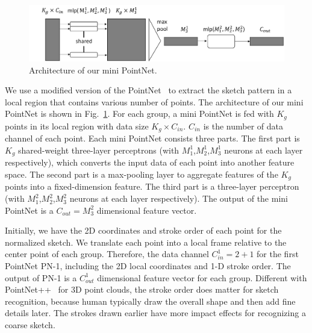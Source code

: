 \begin{figure}
	\centering
	\includegraphics[width=\columnwidth]{images/pointnet.png}
	\caption{Architecture of our mini PointNet.}
	\label{fig:miniPN}
\end{figure}

\vspace{0.1cm}
%
We use a modified version of the PointNet~\cite{qi2017pointnet} to extract the sketch pattern in a local region that contains various number of points.
The architecture of our mini PointNet is shown in Fig.~\ref{fig:miniPN}.
%
%
For each group, a mini PointNet is fed with $K_g$ points in its local region with data size $K_g \times C_{in}$.
$C_{in}$ is the number of data channel of each point.
Each mini PointNet consists three parts.
The first part is $K_g$ shared-weight three-layer perceptrons (with $M^{1}_1$,$M^{1}_2$,$M^{1}_3$ neurons at each layer respectively), which converts the input data of each point into another feature space.
%
The second part is a max-pooling layer to aggregate features of the $K_g$ points into a fixed-dimension feature.
%
The third part is a three-layer perceptron (with $M^{2}_1$,$M^{2}_2$,$M^{2}_3$ neurons at each layer respectively).
%
The output of the mini PointNet is a $C_{out}=M^{2}_3$ dimensional feature vector.


Initially, we have the 2{D} coordinates and stroke order of each point for the normalized sketch.
We translate each point into a local frame relative to the center point of each group.
Therefore, the data channel $C^1_{in}=2+1$ for the first PointNet PN-1, including the 2D local coordinates and 1-D stroke order.
The output of PN-1 is a $C^1_{out}$ dimensional feature vector for each group.
%
Different with PointNet++~\cite{qi2017pointnetplusplus} for 3D point clouds, the stroke order does matter for sketch recognition, because human typically draw the overall shape and then add fine details later.
%
The strokes drawn earlier have more impact effects for recognizing a coarse sketch.
%

